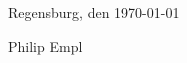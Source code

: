 \documentclass[10pt,A4,german]{article}
\begin{document}
\begin{paracol}{2}
\begin{rightcolumn}
Regensburg, den \today     \hspace{1cm}   \hrulefill

\hspace*{30mm}\phantom{Regensburg, den \today }Philip Empl

\end{rightcolumn}
\end{paracol}
\end{document}
